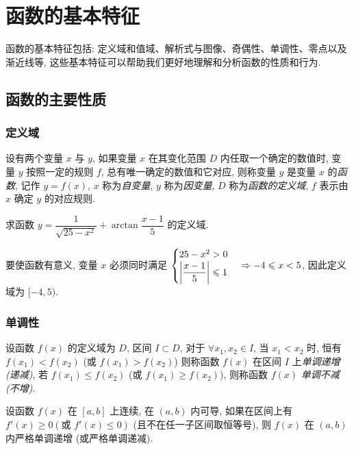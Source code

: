 \section{函数的基本特征}

函数的基本特征包括: 定义域和值域、解析式与图像、奇偶性、单调性、零点以及渐近线等, 这些基本特征可以帮助我们更好地理解和分析函数的性质和行为.

\subsection{函数的主要性质}

\subsubsection{定义域}

\begin{definition}[函数的概念]
    设有两个变量 $x$ 与 $y$, 如果变量 $x$ 在其变化范围 $D$ 内任取一个确定的数值时, 变量 $y$ 按照一定的规则 $f$, 总有唯一确定的数值和它对应, 则称变量 $y$ 是变量 $x$ 的\textit{函数}, 记作 $y=f(x)$, 
    $x$ 称为\textit{自变量}, $y$ 称为\textit{因变量}, $D$ 称为\textit{函数的定义域}, $f$ 表示由 $x$ 确定 $y$ 的对应规则.
\end{definition}

\begin{example}
    求函数 $y=\dfrac{1}{\sqrt{25-x^2}}+\arctan\dfrac{x-1}{5}$ 的定义域.
\end{example}
\begin{solution}
    要使函数有意义, 变量 $x$ 必须同时满足 $\begin{cases}
        25-x^2>0\\\qty|\dfrac{x-1}{5}|\leqslant 1
    \end{cases}\Rightarrow -4\leqslant x<5$, 因此定义域为 $[-4,5).$
\end{solution}

\subsubsection{单调性}

\begin{definition}[函数的单调性]
    设函数 $f(x)$ 的定义域为 $D$, 区间 $I\subset D$, 对于 $\forall x_1,x_2\in I$, 当 $x_1<x_2$ 时, 恒有 $f(x_1)<f(x_2)$ (或 $f(x_1)>f(x_2)$) 则称函数 $f(x)$ 在区间 $I$ 上\textit{单调递增 (递减)}, 
    若 $f(x_1)\leqslant f(x_2)$ (或 $f(x_1)\geqslant f(x_2)$), 则称函数 $f(x)$ \textit{单调不减 (不增)}.
\end{definition}
\begin{theorem}[函数的单调性判定]
    设函数 $f(x)$ 在 $[a,b]$ 上连续, 在 $(a,b)$ 内可导, 如果在区间上有 $f'(x)\geqslant 0(\text{或 }f'(x)\leqslant 0)$ (且不在任一子区间取恒等号), 则 $f(x)$ 在 $(a,b)$ 内严格单调递增 (或严格单调递减).
\end{theorem}

